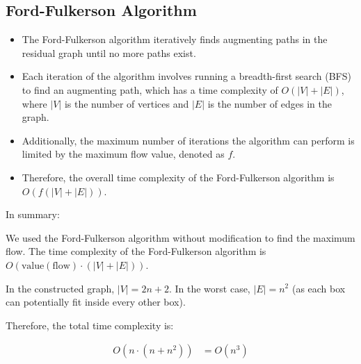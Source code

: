 \documentclass{article}
\begin{document}
\subsection*{Ford-Fulkerson Algorithm}
\begin{itemize}
    \item The Ford-Fulkerson algorithm iteratively finds augmenting paths in the residual graph until no more paths exist.
    \item Each iteration of the algorithm involves running a breadth-first search (BFS) to find an augmenting path, which has a time complexity of $O(|V| + |E|)$, where $|V|$ is the number of vertices and $|E|$ is the number of edges in the graph.
    \item Additionally, the maximum number of iterations the algorithm can perform is limited by the maximum flow value, denoted as $f$.
    \item Therefore, the overall time complexity of the Ford-Fulkerson algorithm is $O(f(|V| + |E|))$.
\end{itemize}

In summary:
\begin{itemize}
    We used the Ford-Fulkerson algorithm without modification to find the maximum flow. The time complexity of the Ford-Fulkerson algorithm is $O(\text{value}(\text{flow}) \cdot (|V| + |E|))$.

    In the constructed graph, $|V| = 2n + 2$. In the worst case, $|E| = n^2$ (as each box can potentially fit inside every other box). 
    
    Therefore, the total time complexity is:
    
    \begin{align*}
    O(n \cdot (n + n^2)) &= O(n^3)
    \end{align*}
    
\end{itemize}

\newpage
\end{document}
